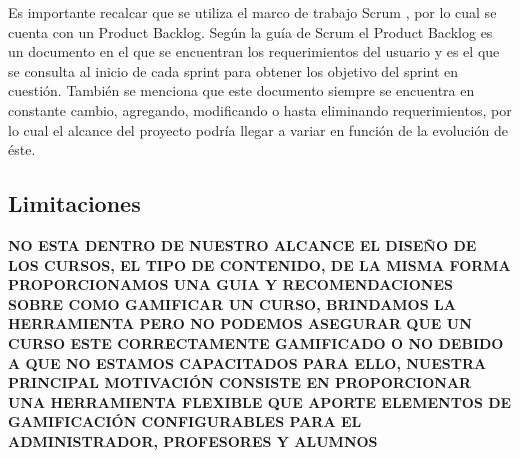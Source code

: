 Es importante recalcar que se utiliza el marco de trabajo Scrum \cite{scrum1}, por lo cual se cuenta con un Product Backlog. Según la guía de Scrum \cite{scrum2} el Product Backlog es un documento en el que se encuentran los requerimientos del usuario y es el que se consulta al inicio de cada sprint para obtener los objetivo del sprint en cuestión. También se menciona que este documento siempre se encuentra en constante cambio, agregando, modificando o hasta eliminando requerimientos, por lo cual el alcance del proyecto podría llegar a variar en función de la evolución de éste.

     

\subsection{Limitaciones}
\label{subsec:limitaciones}

{\bf\color{red} NO ESTA DENTRO DE NUESTRO ALCANCE EL DISEÑO DE LOS CURSOS, EL TIPO DE CONTENIDO, DE LA MISMA FORMA PROPORCIONAMOS UNA GUIA Y RECOMENDACIONES SOBRE COMO GAMIFICAR UN CURSO, BRINDAMOS LA HERRAMIENTA PERO NO PODEMOS ASEGURAR QUE UN CURSO ESTE CORRECTAMENTE GAMIFICADO O NO DEBIDO A QUE NO ESTAMOS CAPACITADOS PARA ELLO, NUESTRA PRINCIPAL MOTIVACIÓN CONSISTE EN PROPORCIONAR UNA HERRAMIENTA FLEXIBLE QUE APORTE ELEMENTOS DE GAMIFICACIÓN CONFIGURABLES PARA EL ADMINISTRADOR, PROFESORES Y ALUMNOS}



